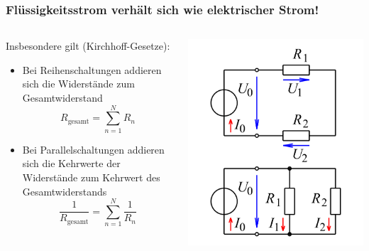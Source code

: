 \documentclass{beamer}
\begin{document}
\begin{frame}
\frametitle{Flüssigkeitsstrom verhält sich wie elektrischer Strom!}

\begin{columns}[c]

\begin{column}{7cm}
Insbesondere gilt (Kirchhoff-Gesetze):
\begin{itemize}
\item
Bei Reihenschaltungen addieren sich die Widerstände zum Gesamtwiderstand 
\[
R_{\text{gesamt}} = \sum_{n=1}^N R_n
\]

\item
Bei Parallelschaltungen addieren sich die Kehrwerte der Widerstände zum Kehrwert des Gesamtwiderstands 
\[
\frac{1}{R_{\text{gesamt}}} = \sum_{n=1}^N \frac{1}{R_n}
\]


\end{itemize}
\end{column}

\begin{column}{4cm}

\begin{center}
\includegraphics[width=\textwidth]{Reihen_parallel_schaltung.png}
\end{center}
\end{column}

\end{columns}

\end{frame}
\end{document}
